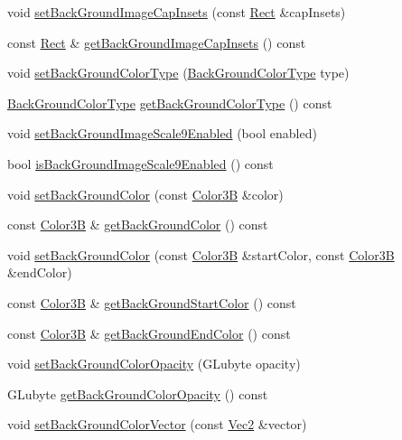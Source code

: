 \begin{DoxyCompactItemize}
void \hyperlink{classui_1_1Layout_ab9eec8cd5da18065215b502bce86d2dd}{set\+Back\+Ground\+Image\+Cap\+Insets} (const \hyperlink{classRect}{Rect} \&cap\+Insets)
\item 
const \hyperlink{classRect}{Rect} \& \hyperlink{classui_1_1Layout_a4ebdbc27ee0e1c3de344c80132297425}{get\+Back\+Ground\+Image\+Cap\+Insets} () const
\item 
void \hyperlink{classui_1_1Layout_a7a6bd8944919e7030cfa62ee6b870a86}{set\+Back\+Ground\+Color\+Type} (\hyperlink{classui_1_1Layout_a2aad69f15823c5f22d8ed72bf2ac7472}{Back\+Ground\+Color\+Type} type)
\item 
\hyperlink{classui_1_1Layout_a2aad69f15823c5f22d8ed72bf2ac7472}{Back\+Ground\+Color\+Type} \hyperlink{classui_1_1Layout_abc5d86e632f8c9ac82118ed6a1e592ef}{get\+Back\+Ground\+Color\+Type} () const
\item 
void \hyperlink{classui_1_1Layout_a1d675f08f0d5d366562e39641a4b668c}{set\+Back\+Ground\+Image\+Scale9\+Enabled} (bool enabled)
\item 
bool \hyperlink{classui_1_1Layout_afcf5c9d16219499c4dacedc2704972af}{is\+Back\+Ground\+Image\+Scale9\+Enabled} () const
\item 
void \hyperlink{classui_1_1Layout_af3c5819c00efadfa70ae258c4e44d2e5}{set\+Back\+Ground\+Color} (const \hyperlink{structColor3B}{Color3B} \&color)
\item 
const \hyperlink{structColor3B}{Color3B} \& \hyperlink{classui_1_1Layout_a2a62061703514408f935daf7bf89af57}{get\+Back\+Ground\+Color} () const
\item 
void \hyperlink{classui_1_1Layout_abaeae43e1b5c726e0d5942f35042489a}{set\+Back\+Ground\+Color} (const \hyperlink{structColor3B}{Color3B} \&start\+Color, const \hyperlink{structColor3B}{Color3B} \&end\+Color)
\item 
const \hyperlink{structColor3B}{Color3B} \& \hyperlink{classui_1_1Layout_a7a34d51eceeb2485877fcfc4efabf789}{get\+Back\+Ground\+Start\+Color} () const
\item 
const \hyperlink{structColor3B}{Color3B} \& \hyperlink{classui_1_1Layout_adfd6290274a4d051b72eec3100a14f3c}{get\+Back\+Ground\+End\+Color} () const
\item 
void \hyperlink{classui_1_1Layout_a69462211ca370314a9f2f9cda130c38d}{set\+Back\+Ground\+Color\+Opacity} (G\+Lubyte opacity)
\item 
G\+Lubyte \hyperlink{classui_1_1Layout_a1635ca93fd35f356f5998a7f6d27ae16}{get\+Back\+Ground\+Color\+Opacity} () const
\item 
void \hyperlink{classui_1_1Layout_aef84038235433bc37df14b05f3a24a6c}{set\+Back\+Ground\+Color\+Vector} (const \hyperlink{classVec2}{Vec2} \&vector)

\end{DoxyCompactItemize}
